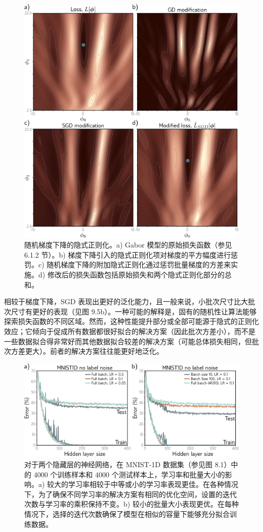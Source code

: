\begin{figure}[ht!]
	\centering
	\includegraphics[width=0.7\linewidth]{png/chapter9/RegImplicit2.png}
	\caption{随机梯度下降的隐式正则化。a) Gabor 模型的原始损失函数（参见 6.1.2 节）。b) 梯度下降引入的隐式正则化项对梯度的平方幅度进行惩罚。c) 随机梯度下降的附加隐式正则化通过惩罚批量梯度的方差来实施。d) 修改后的损失函数包括原始损失和两个隐式正则化部分的总和。}
\end{figure}


相较于梯度下降，SGD 表现出更好的泛化能力，且一般来说，小批次尺寸比大批次尺寸有更好的表现（见图 9.5b）。一种可能的解释是，固有的随机性让算法能够探索损失函数的不同区域。然而，这种性能提升部分或全部可能源于隐式的正则化效应；它倾向于促成所有数据都很好拟合的解决方案（因此批次方差小），而不是一些数据拟合得非常好而其他数据拟合较差的解决方案（可能总体损失相同，但批次方差更大）。前者的解决方案往往能更好地泛化。

\begin{figure}[ht!]
	\centering
	\includegraphics[width=0.7\linewidth]{png/chapter9/RegLR.png}
	\caption{对于两个隐藏层的神经网络，在 MNIST-1D 数据集（参见图 8.1）中的 4000 个训练样本和 4000 个测试样本上，学习率和批量大小的影响。a) 较大的学习率相较于中等或小的学习率表现更佳。在各种情况下，为了确保不同学习率的解决方案有相同的优化空间，设置的迭代次数与学习率的乘积保持不变。b) 较小的批量大小表现更优。在每种情况下，选择的迭代次数确保了模型在相似的容量下能够充分拟合训练数据。}
\end{figure}


